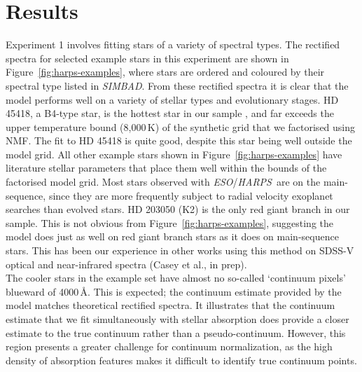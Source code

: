 \documentclass[modern,linenumbers]{aastex631}
\newcommand{\project}[1]{\textit{#1}}
\newcommand{\eso}{\project{ESO}}
\newcommand{\harps}{\project{HARPS}}
\renewcommand{\added}[1]{#1}
\begin{document}
\section{Results} \label{sec:results}

Experiment 1 involves fitting stars of a variety of spectral types. The rectified spectra for selected example stars in this experiment are shown in Figure~\ref{fig:harps-examples}, where stars are ordered and coloured by their spectral type listed in \project{SIMBAD}. From these rectified spectra it is clear that the model performs well on a variety of stellar types and evolutionary stages. HD 45418, a B4-type star, is the hottest star in our sample  \citep[$T_\mathrm{eff} = 16{,}750\,K$ according to ][]{2015MNRAS.454...28M}, and far exceeds the upper temperature bound (8,000\,K) of the synthetic grid that we factorised using NMF. The fit to HD 45418 is quite good, despite this star being well outside the model grid. All other example stars shown in Figure~\ref{fig:harps-examples} have literature stellar parameters that place them well within the bounds of the factorised model grid. Most stars observed with \eso/\harps\ are on the main-sequence, since they are more frequently subject to radial velocity exoplanet searches than evolved stars. HD 203050 (K2) is the only red giant branch in our sample. This is not obvious from Figure~\ref{fig:harps-examples}, suggesting the model does just as well on red giant branch stars as it does on main-sequence stars. This has been our experience in other works using this method on SDSS-V optical and near-infrared spectra (Casey et al., in prep).\\


The cooler stars in the example set have almost no so-called `continuum pixels' blueward of 4000\,\AA. This is expected; the continuum estimate provided by the model matches theoretical rectified spectra. It illustrates that the continuum estimate that we fit simultaneously with stellar absorption does provide a closer estimate to the true continuum rather than a pseudo-continuum. \added{However, this region presents a greater challenge for continuum normalization, as the high density of absorption features makes it difficult to identify true continuum points.}\\
\end{document}
